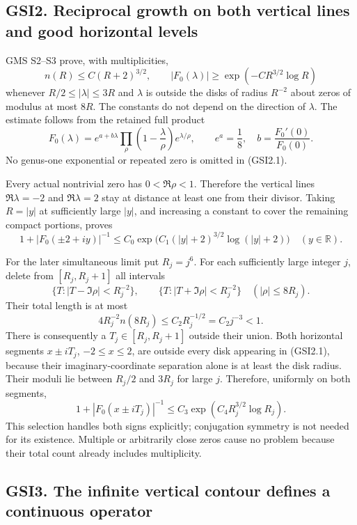 \subsection{GSI2. Reciprocal growth on both vertical lines and good
horizontal
levels}\label{gsi2.-reciprocal-growth-on-both-vertical-lines-and-good-horizontal-levels}

GMS S2--S3 prove, with multiplicities, \[
n(R)\le C(R+2)^{3/2},\qquad
|F_0(\lambda)|\ge\exp(-C R^{3/2}\log R)
\tag{GSI2.1}
\] whenever \(R/2\le|\lambda|\le3R\) and \(\lambda\) is outside the
disks of radius \(R^{-2}\) about zeros of modulus at most \(8R\). The
constants do not depend on the direction of \(\lambda\). The estimate
follows from the retained full product \[
F_0(\lambda)=e^{a+b\lambda}
\prod_{\rho}\left(1-\frac\lambda\rho\right)e^{\lambda/\rho},
\qquad e^a=\frac18,\quad b=\frac{F_0'(0)}{F_0(0)}.
\tag{GSI2.2}
\] No genus-one exponential or repeated zero is omitted in (GSI2.1).

Every actual nontrivial zero has \(0<\Re\rho<1\). Therefore the vertical
lines \(\Re\lambda=-2\) and \(\Re\lambda=2\) stay at distance at least
one from their divisor. Taking \(R=|y|\) at sufficiently large \(|y|\),
and increasing a constant to cover the remaining compact portions,
proves \[
1+|F_0(\pm2+iy)|^{-1}
\le C_0\exp\bigl(C_1(|y|+2)^{3/2}\log(|y|+2)\bigr)
\quad(y\in\mathbb R).
\tag{GSI2.3}
\]

For the later simultaneous limit put \(R_j=j^6\). For each sufficiently
large integer \(j\), delete from \([R_j,R_j+1]\) all intervals \[
\{T:|T-\Im\rho|<R_j^{-2}\},\qquad
\{T:|T+\Im\rho|<R_j^{-2}\}
\quad(|\rho|\le8R_j).
\tag{GSI2.4}
\] Their total length is at most \[
4R_j^{-2}n(8R_j)\le C_2R_j^{-1/2}=C_2j^{-3}<1.
\tag{GSI2.5}
\] There is consequently a \(T_j\in[R_j,R_j+1]\) outside their union.
Both horizontal segments \(x\pm iT_j\), \(-2\le x\le2\), are outside
every disk appearing in (GSI2.1), because their imaginary-coordinate
separation alone is at least the disk radius. Their moduli lie between
\(R_j/2\) and \(3R_j\) for large \(j\). Therefore, uniformly on both
segments, \[
1+|F_0(x\pm iT_j)|^{-1}
\le C_3\exp(C_4R_j^{3/2}\log R_j).
\tag{GSI2.6}
\] This selection handles both signs explicitly; conjugation symmetry is
not needed for its existence. Multiple or arbitrarily close zeros cause
no problem because their total count already includes multiplicity.

\subsection{GSI3. The infinite vertical contour defines a continuous
operator}\label{gsi3.-the-infinite-vertical-contour-defines-a-continuous-operator}


